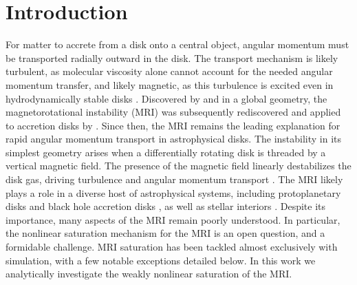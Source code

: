 \documentclass[twocolumn]{aastex61}
\begin{document}
\section{Introduction} \label{sec:intro}
For matter to accrete from a disk onto a central object, angular momentum must be transported radially outward in the disk. The transport mechanism is likely turbulent, as molecular viscosity alone cannot account for the needed angular momentum transfer, and likely magnetic, as this turbulence is excited even in hydrodynamically stable disks \citep{Shakura:1973wg}. Discovered by \citet{Chandrasekhar:1960wh} and \citet{Velikhov:1959} in a global geometry, the magnetorotational instability (MRI) was subsequently rediscovered and applied to accretion disks by \citet{Balbus:1991vs}. Since then, the MRI remains the leading explanation for rapid angular momentum transport in astrophysical disks. The instability in its simplest geometry arises when a differentially rotating disk is threaded by a vertical magnetic field. The presence of the magnetic field linearly destabilizes the disk gas, driving turbulence and angular momentum transport \citep[e.g.][]{2011ApJ...738...84H,2014MNRAS.438.2513P,2013MNRAS.435.2281P}. The MRI likely plays a role in a diverse host of astrophysical systems, including protoplanetary disks \citep[e.g.][]{2015ApJ...798...84B} and black hole accretion disks \citep[e.g.][]{2013ApJ...769..156S}, as well as stellar interiors \citep[e.g.][]{2015ApJ...799...85W}. Despite its importance, many aspects of the MRI remain poorly understood. In particular, the nonlinear saturation mechanism for the MRI is an open question, and a formidable challenge. MRI saturation has been tackled almost exclusively with simulation, with a few notable exceptions detailed below. In this work we analytically investigate the weakly nonlinear saturation of the MRI.
\end{document}
